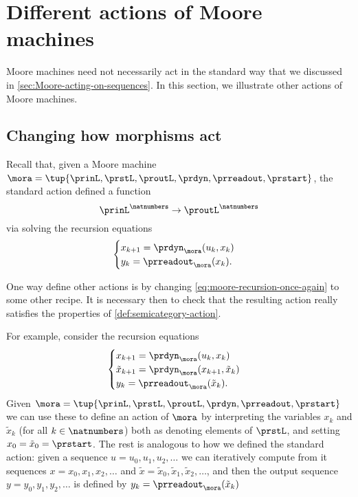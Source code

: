 
\section{Different actions of Moore machines}
\label{sec:different-actions-of-moore-machines}


Moore machines need not necessarily act in the standard way that we discussed in \cref{sec:Moore-acting-on-sequences}. In this section, we illustrate other actions of Moore machines. 

\subsection{Changing how morphisms act}

Recall that, given a Moore machine $\mora = \tup{\prinL,\prstL,\proutL,\prdyn,\prreadout,\prstart}$, the standard action defined a function 
\begin{equation}
{\prinL}^\natnumbers \to {\proutL}^\natnumbers
\end{equation}
via solving the recursion equations 
\begin{equation}
\label{eq:moore-recursion-once-again}
    \begin{cases}
        x_{k+1} = \prdyn_\mora(u_k, x_k) \\
        y_{k}   = \prreadout_\mora(x_{k}).
    \end{cases}
\end{equation}

One way define other actions is by changing \cref{eq:moore-recursion-once-again} to some other recipe. It is necessary then to check that the resulting action really satisfies the properties of \cref{def:semicategory-action}. 

For example, consider the recursion equations
\begin{equation}
\label{eq:moore-new-recursion-equations}
    \begin{cases}
        x_{k+1} = \prdyn_\mora(u_k, x_k) \\
        \tilde x_{k+1} = \prdyn_\mora(x_{k+1}, \tilde x_k) \\
        y_{k}   = \prreadout_\mora(\tilde x_{k}).
    \end{cases}
\end{equation}
Given  $\mora = \tup{\prinL,\prstL,\proutL,\prdyn,\prreadout,\prstart}$ we can use these to define an action of $\mora$ by interpreting the variables $x_k$ and $\tilde x_k$ (for all $k \in \natnumbers$) both as denoting elements of $\prstL$, and setting $x_0 = \tilde x_0 = \prstart$. The rest is analogous to how we defined the standard action: given a sequence $u = u_0, u_1, u_2, \dots$ we can iteratively compute from it sequences $x = x_0, x_1, x_2, \dots $ and $\tilde x = \tilde x_0, \tilde x_1, \tilde x_2, \dots$, and then the output sequence $y = y_0, y_1, y_2, \dots $ is defined by $y_{k}   = \prreadout_\mora(\tilde x_{k})$


